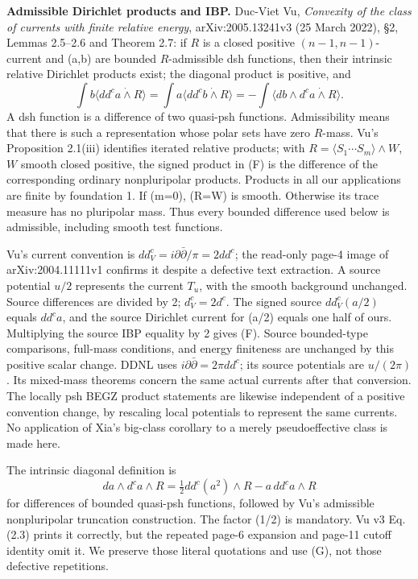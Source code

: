 \documentclass[
  11pt,
]{article}
\begin{document}
\begin{enumerate}
  \textbf{Admissible Dirichlet products and IBP.} Duc-Viet Vu,
  \emph{Convexity of the class of currents with finite relative energy},
  arXiv:2005.13241v3 (25 March 2022), §2, Lemmas 2.5--2.6 and Theorem
  2.7: if \(R\) is a closed positive \((n-1,n-1)\)-current and (a,b) are
  bounded \(R\)-admissible dsh functions, then their intrinsic relative
  Dirichlet products exist; the diagonal product is positive, and \[
  \int b\langle dd^ca\dot\wedge R\rangle
  =\int a\langle dd^cb\dot\wedge R\rangle
  =-\int\langle db\wedge d^ca\dot\wedge R\rangle.
  \tag{F}
  \] A dsh function is a difference of two quasi-psh functions.
  Admissibility means that there is such a representation whose polar
  sets have zero \(R\)-mass. Vu's Proposition 2.1(iii) identifies
  iterated relative products; with
  \(R=\langle S_1\cdots S_m\rangle\wedge W\), \(W\) smooth closed
  positive, the signed product in (F) is the difference of the
  corresponding ordinary nonpluripolar products. Products in all our
  applications are finite by foundation 1. If (m=0), (R=W) is smooth.
  Otherwise its trace measure has no pluripolar mass. Thus every bounded
  difference used below is admissible, including smooth test functions.
\end{enumerate}

Vu's current convention is \(dd^c_V=i\partial\bar\partial/\pi=2dd^c\);
the read-only page-4 image of arXiv:2004.11111v1 confirms it despite a
defective text extraction. A source potential \(u/2\) represents the
current \(T_u\), with the smooth background unchanged. Source
differences are divided by 2; \(d^c_V=2d^c\). The signed source
\(dd^c_V(a/2)\) equals \(dd^ca\), and the source Dirichlet current for
(a/2) equals one half of ours. Multiplying the source IBP equality by 2
gives (F). Source bounded-type comparisons, full-mass conditions, and
energy finiteness are unchanged by this positive scalar change. DDNL
uses \(i\partial\bar\partial=2\pi dd^c\); its source potentials are
\(u/(2\pi)\). Its mixed-mass theorems concern the same actual currents
after that conversion. The locally psh BEGZ product statements are
likewise independent of a positive convention change, by rescaling local
potentials to represent the same currents. No application of Xia's
big-class corollary to a merely pseudoeffective class is made here.

The intrinsic diagonal definition is \[
da\wedge d^ca\wedge R=\tfrac12dd^c(a^2)\wedge R-a\,dd^ca\wedge R
\tag{G}
\] for differences of bounded quasi-psh functions, followed by Vu's
admissible nonpluripolar truncation construction. The factor (1/2) is
mandatory. Vu v3 Eq. (2.3) prints it correctly, but the repeated page-6
expansion and page-11 cutoff identity omit it. We preserve those literal
quotations and use (G), not those defective repetitions.
\end{document}
